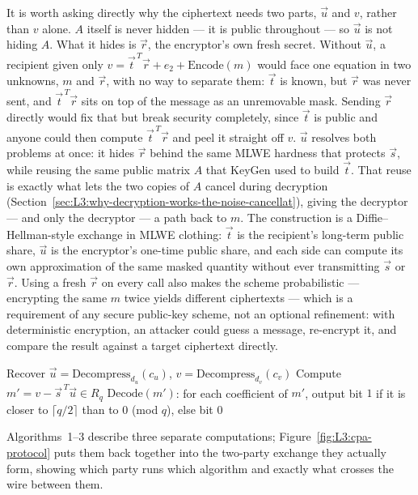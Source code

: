 It is worth asking directly why the ciphertext needs two parts, $\vec u$ and $v$, rather than $v$ alone. $A$ itself is never hidden --- it is public throughout --- so $\vec u$ is not hiding $A$. What it hides is $\vec r$, the encryptor's own fresh secret. Without $\vec u$, a recipient given only $v = \vec t^{\,T}\vec r + e_2 + \mathrm{Encode}(m)$ would face one equation in two unknowns, $m$ and $\vec r$, with no way to separate them: $\vec t$ is known, but $\vec r$ was never sent, and $\vec t^{\,T}\vec r$ sits on top of the message as an unremovable mask. Sending $\vec r$ directly would fix that but break security completely, since $\vec t$ is public and anyone could then compute $\vec t^{\,T}\vec r$ and peel it straight off $v$. $\vec u$ resolves both problems at once: it hides $\vec r$ behind the same MLWE hardness that protects $\vec s$, while reusing the same public matrix $A$ that KeyGen used to build $\vec t$. That reuse is exactly what lets the two copies of $A$ cancel during decryption (Section~\ref{sec:L3:why-decryption-works-the-noise-cancellat}), giving the decryptor --- and only the decryptor --- a path back to $m$. The construction is a Diffie--Hellman-style exchange in MLWE clothing: $\vec t$ is the recipient's long-term public share, $\vec u$ is the encryptor's one-time public share, and each side can compute its own approximation of the same masked quantity without ever transmitting $\vec s$ or $\vec r$. Using a fresh $\vec r$ on every call also makes the scheme probabilistic --- encrypting the same $m$ twice yields different ciphertexts --- which is a requirement of any secure public-key scheme, not an optional refinement: with deterministic encryption, an attacker could guess a message, re-encrypt it, and compare the result against a target ciphertext directly.

\begin{algorithm}[ht]
\caption{Kyber.CPAPKE.Dec$(sk = \vec s,\ c = (c_u, c_v))$}
\begin{algorithmic}[1]
\State Recover $\vec u = \mathrm{Decompress}_{d_u}(c_u)$, $v = \mathrm{Decompress}_{d_v}(c_v)$
\State Compute $m' = v - \vec s^{\,T}\vec u \in R_q$
\State \Return $\mathrm{Decode}(m')$: for each coefficient of $m'$, output bit $1$ if it is closer to $\lceil q/2 \rceil$ than to $0$ (mod $q$), else bit $0$
\end{algorithmic}
\end{algorithm}

Algorithms~1--3 describe three separate computations; Figure~\ref{fig:L3:cpa-protocol} puts them back together into the two-party exchange they actually form, showing which party runs which algorithm and exactly what crosses the wire between them.


